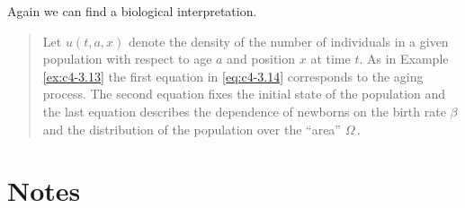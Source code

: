 Again we can find a biological interpretation.
\begin{quote}
Let $u(t,a,x)$ denote the density of the number of individuals in a given population with respect to age $a$ and position $x$ at time $t$.
As in Example \ref{ex:c4-3.13} the first equation in \eqref{eq:c4-3.14} corresponds to the aging process.
The second equation fixes the initial state of the population and the last equation describes the dependence of newborns on the birth rate $\beta$ and the distribution of the population over the \enquote{area} $\Omega$\,.
\end{quote}
\section*{Notes}

